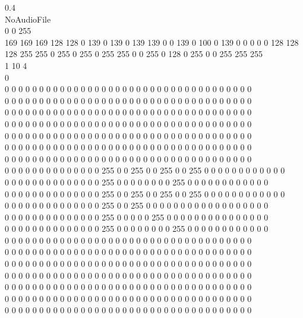 \documentclass[12pt]{extarticle}
\begin{document}
0.4  \\
NoAudioFile\\
0 0 255 \\
169 169 169 128 128 0 139 0 139 0 139 139 0 0 139 0 100 0 139 0 0 0 0 0 128 128 128 255 255 0 255 0 255 0 255 255 0 0 255 0 128 0 255 0 0 255 255 255 \\
1 10 4 \\
0 \\
0 0 0 0 0 0 0 0 0 0 0 0 0 0 0 0 0 0 0 0 0 0 0 0 0 0 0 0 0 0 0 0 0 0 0 0 \\
0 0 0 0 0 0 0 0 0 0 0 0 0 0 0 0 0 0 0 0 0 0 0 0 0 0 0 0 0 0 0 0 0 0 0 0 \\
0 0 0 0 0 0 0 0 0 0 0 0 0 0 0 0 0 0 0 0 0 0 0 0 0 0 0 0 0 0 0 0 0 0 0 0 \\
0 0 0 0 0 0 0 0 0 0 0 0 0 0 0 0 0 0 0 0 0 0 0 0 0 0 0 0 0 0 0 0 0 0 0 0 \\
0 0 0 0 0 0 0 0 0 0 0 0 0 0 0 0 0 0 0 0 0 0 0 0 0 0 0 0 0 0 0 0 0 0 0 0 \\
0 0 0 0 0 0 0 0 0 0 0 0 0 0 0 0 0 0 0 0 0 0 0 0 0 0 0 0 0 0 0 0 0 0 0 0 \\
0 0 0 0 0 0 0 0 0 0 0 0 0 0 0 0 0 0 0 0 0 0 0 0 0 0 0 0 0 0 0 0 0 0 0 0 \\
0 0 0 0 0 0 0 0 0 0 0 0 0 0 255 0 0 255 0 0 255 0 0 255 0 0 0 0 0 0 0 0 0 0 0 0\\ 
0 0 0 0 0 0 0 0 0 0 0 0 0 0 255 0 0 0 0 0 0 0 0 255 0 0 0 0 0 0 0 0 0 0 0 0 \\
0 0 0 0 0 0 0 0 0 0 0 0 0 0 255 0 0 255 0 0 255 0 0 255 0 0 0 0 0 0 0 0 0 0 0 0\\ 
0 0 0 0 0 0 0 0 0 0 0 0 0 0 255 0 0 255 0 0 0 0 0 0 0 0 0 0 0 0 0 0 0 0 0 0 \\
0 0 0 0 0 0 0 0 0 0 0 0 0 0 255 0 0 0 0 0 255 0 0 0 0 0 0 0 0 0 0 0 0 0 0 0 \\
0 0 0 0 0 0 0 0 0 0 0 0 0 0 255 0 0 0 0 0 0 0 0 255 0 0 0 0 0 0 0 0 0 0 0 0 \\
0 0 0 0 0 0 0 0 0 0 0 0 0 0 0 0 0 0 0 0 0 0 0 0 0 0 0 0 0 0 0 0 0 0 0 0 \\
0 0 0 0 0 0 0 0 0 0 0 0 0 0 0 0 0 0 0 0 0 0 0 0 0 0 0 0 0 0 0 0 0 0 0 0 \\
0 0 0 0 0 0 0 0 0 0 0 0 0 0 0 0 0 0 0 0 0 0 0 0 0 0 0 0 0 0 0 0 0 0 0 0 \\
0 0 0 0 0 0 0 0 0 0 0 0 0 0 0 0 0 0 0 0 0 0 0 0 0 0 0 0 0 0 0 0 0 0 0 0 \\
0 0 0 0 0 0 0 0 0 0 0 0 0 0 0 0 0 0 0 0 0 0 0 0 0 0 0 0 0 0 0 0 0 0 0 0 \\
0 0 0 0 0 0 0 0 0 0 0 0 0 0 0 0 0 0 0 0 0 0 0 0 0 0 0 0 0 0 0 0 0 0 0 0 \\
0 0 0 0 0 0 0 0 0 0 0 0 0 0 0 0 0 0 0 0 0 0 0 0 0 0 0 0 0 0 0 0 0 0 0 0 \\\\
\end{document}
